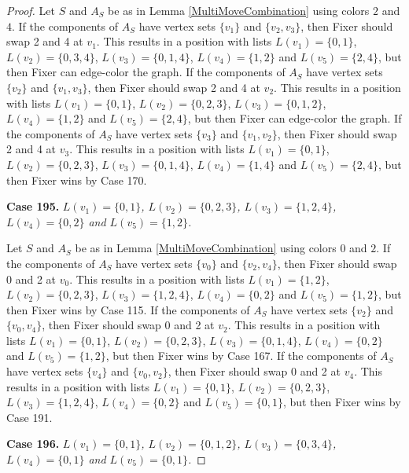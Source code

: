 \documentclass[12pt]{amsart}
\theoremstyle{plain}
\theoremstyle{definition}
\theoremstyle{remark}
\begin{document}
\begin{proof}
Let $S$ and $A_S$ be as in Lemma \ref{MultiMoveCombination} using colors $2$ and $4$. If the components of $A_S$ have vertex sets $\{v_1\}$ and $\{v_2, v_3\}$, then Fixer should swap 2 and 4 at $v_1$. This results in a position with lists $L(v_1) = \{0, 1\}$, $L(v_2) = \{0, 3, 4\}$, $L(v_3) = \{0, 1, 4\}$, $L(v_4) = \{1, 2\}$ and $L(v_5) = \{2, 4\}$, but then Fixer can edge-color the graph.
If the components of $A_S$ have vertex sets $\{v_2\}$ and $\{v_1, v_3\}$, then Fixer should swap 2 and 4 at $v_2$. This results in a position with lists $L(v_1) = \{0, 1\}$, $L(v_2) = \{0, 2, 3\}$, $L(v_3) = \{0, 1, 2\}$, $L(v_4) = \{1, 2\}$ and $L(v_5) = \{2, 4\}$, but then Fixer can edge-color the graph.
If the components of $A_S$ have vertex sets $\{v_3\}$ and $\{v_1, v_2\}$, then Fixer should swap 2 and 4 at $v_3$. This results in a position with lists $L(v_1) = \{0, 1\}$, $L(v_2) = \{0, 2, 3\}$, $L(v_3) = \{0, 1, 4\}$, $L(v_4) = \{1, 4\}$ and $L(v_5) = \{2, 4\}$, but then Fixer wins by Case 170.

\noindent\textbf{Case 195.  }\textit{$L(v_1) = \{0, 1\}$, $L(v_2) = \{0, 2, 3\}$, $L(v_3) = \{1, 2, 4\}$, $L(v_4) = \{0, 2\}$ and $L(v_5) = \{1, 2\}$.}

Let $S$ and $A_S$ be as in Lemma \ref{MultiMoveCombination} using colors $0$ and $2$. If the components of $A_S$ have vertex sets $\{v_0\}$ and $\{v_2, v_4\}$, then Fixer should swap 0 and 2 at $v_0$. This results in a position with lists $L(v_1) = \{1, 2\}$, $L(v_2) = \{0, 2, 3\}$, $L(v_3) = \{1, 2, 4\}$, $L(v_4) = \{0, 2\}$ and $L(v_5) = \{1, 2\}$, but then Fixer wins by Case 115.
If the components of $A_S$ have vertex sets $\{v_2\}$ and $\{v_0, v_4\}$, then Fixer should swap 0 and 2 at $v_2$. This results in a position with lists $L(v_1) = \{0, 1\}$, $L(v_2) = \{0, 2, 3\}$, $L(v_3) = \{0, 1, 4\}$, $L(v_4) = \{0, 2\}$ and $L(v_5) = \{1, 2\}$, but then Fixer wins by Case 167.
If the components of $A_S$ have vertex sets $\{v_4\}$ and $\{v_0, v_2\}$, then Fixer should swap 0 and 2 at $v_4$. This results in a position with lists $L(v_1) = \{0, 1\}$, $L(v_2) = \{0, 2, 3\}$, $L(v_3) = \{1, 2, 4\}$, $L(v_4) = \{0, 2\}$ and $L(v_5) = \{0, 1\}$, but then Fixer wins by Case 191.

\noindent\textbf{Case 196.  }\textit{$L(v_1) = \{0, 1\}$, $L(v_2) = \{0, 1, 2\}$, $L(v_3) = \{0, 3, 4\}$, $L(v_4) = \{0, 1\}$ and $L(v_5) = \{0, 1\}$.}


\end{proof}
\end{document}
